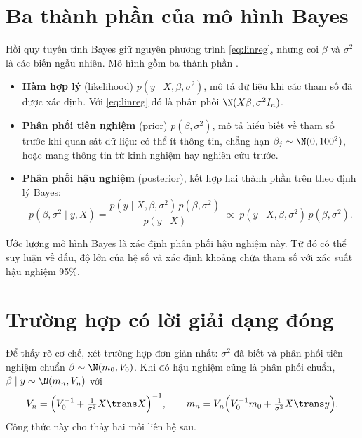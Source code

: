 \documentclass[12pt,a4paper]{report}
\begin{document}
\section{Ba thành phần của mô hình Bayes}

Hồi quy tuyến tính Bayes giữ nguyên phương trình \eqref{eq:linreg}, nhưng coi
$\beta$ và $\sigma^2$ là các biến ngẫu nhiên. Mô hình gồm ba thành phần
\cite{gelman2013bda, bishop2006prml}.

\begin{itemize}
  \item \textbf{Hàm hợp lý} (likelihood) $p(y \mid X, \beta, \sigma^2)$, mô tả
    dữ liệu khi các tham số đã được xác định. Với \eqref{eq:linreg} đó là
    phân phối $\N(X\beta, \sigma^2 I_n)$.
  \item \textbf{Phân phối tiên nghiệm} (prior) $p(\beta, \sigma^2)$, mô tả hiểu
    biết về tham số trước khi quan sát dữ liệu: có thể ít thông tin, chẳng hạn
    $\beta_j \sim \N(0, 100^2)$, hoặc mang thông tin từ kinh nghiệm hay nghiên
    cứu trước.
  \item \textbf{Phân phối hậu nghiệm} (posterior), kết hợp hai thành phần trên
    theo định lý Bayes:
    \begin{equation}
      \label{eq:bayes}
      p(\beta, \sigma^2 \mid y, X) =
      \frac{p(y \mid X, \beta, \sigma^2)\, p(\beta, \sigma^2)}{p(y \mid X)}
      \;\propto\; p(y \mid X, \beta, \sigma^2)\, p(\beta, \sigma^2).
    \end{equation}
\end{itemize}

Ước lượng mô hình Bayes là xác định phân phối hậu nghiệm này. Từ đó có thể
suy luận về dấu, độ lớn của hệ số và xác định khoảng chứa tham số với xác suất
hậu nghiệm 95\%.

\section{Trường hợp có lời giải dạng đóng}
\label{sec:closed-form}

Để thấy rõ cơ chế, xét trường hợp đơn giản nhất: $\sigma^2$ đã biết và phân phối tiên nghiệm
chuẩn $\beta \sim \N(m_0, V_0)$. Khi đó hậu nghiệm cũng là phân phối chuẩn,
$\beta \mid y \sim \N(m_n, V_n)$ với
%
\begin{equation}
  \label{eq:conj}
  V_n = \Bigl(V_0^{-1} + \tfrac{1}{\sigma^2} X\trans X\Bigr)^{-1},
  \qquad
  m_n = V_n \Bigl(V_0^{-1} m_0 + \tfrac{1}{\sigma^2} X\trans y\Bigr).
\end{equation}
%
Công thức này cho thấy hai mối liên hệ sau.
\end{document}

